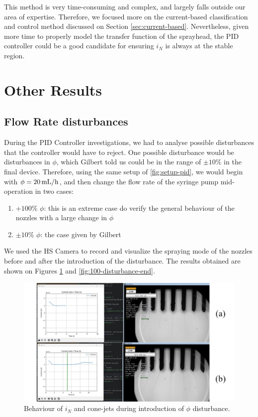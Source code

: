 \documentclass[oneside,12pt]{article}
\begin{document}
This method is very time-consuming and complex, and largely falls outside our area of expertise. Therefore, we focused
more on the current-based classification and control method discussed on Section \ref{sec:current-based}. Nevertheless, 
given more time to properly model the transfer function of the sprayhead, the PID controller could be a good candidate 
for ensuring $i_N$ is always at the stable region.

\section{Other Results}\label{sec:utils}

\subsection{Flow Rate disturbances}

During the PID Controller investigations, we had to analyse possible disturbances that the controller would have to reject.
One possible disturbance would be disturbances in $\phi$, which Gilbert told us could be in the range of $\pm 10\%$ in the
final device. Therefore, using the same setup of \autoref{fig:setup-pid}, we would begin with $\phi = 20 \,\mathrm{mL/h}$, and then 
change the flow rate of the syringe pump mid-operation in two cases:

\begin{enumerate}
    \item $+ 100\% \,\, \phi$: this is an extreme case do verify the general behaviour of the nozzles with a large change in $\phi$
    \item $\pm 10\%  \,\,\phi$: the case given by Gilbert
\end{enumerate}

We used the HS Camera to record and visualize the spraying mode of the nozzles before and after the introduction of the disturbance.
The results obtained are shown on Figures \ref{fig:100-disturbance-start} and \ref{fig:100-disturbance-end}.

\begin{figure}[h!]
    \centering
    \includegraphics[width=\textwidth,trim=1 1 1 1,clip]{figures/100-disturbance-start.png}
    \caption{Behaviour of $i_N$ and cone-jets during introduction of $\phi$ disturbance.}
    \label{fig:100-disturbance-start}
\end{figure}
\end{document}
